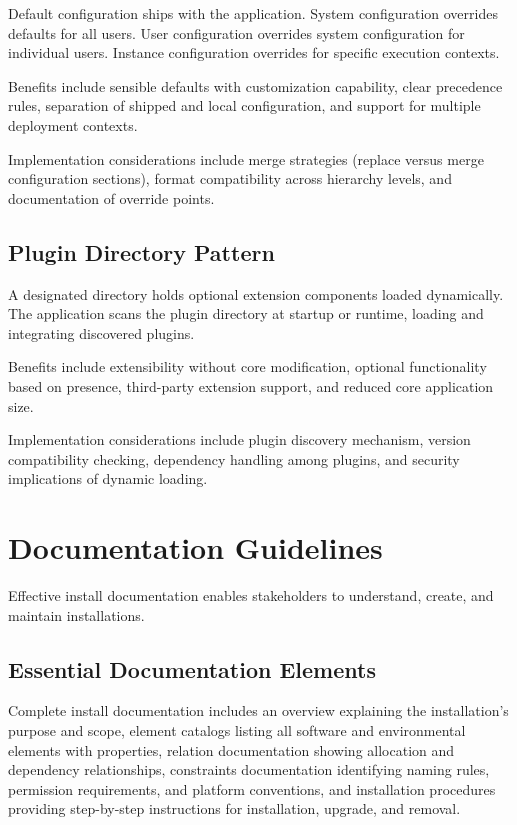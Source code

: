 \documentclass[11pt]{article}
\begin{document}
Default configuration ships with the application. System configuration overrides defaults for all users. User configuration overrides system configuration for individual users. Instance configuration overrides for specific execution contexts.

Benefits include sensible defaults with customization capability, clear precedence rules, separation of shipped and local configuration, and support for multiple deployment contexts.

Implementation considerations include merge strategies (replace versus merge configuration sections), format compatibility across hierarchy levels, and documentation of override points.

\subsection{Plugin Directory Pattern}

A designated directory holds optional extension components loaded dynamically. The application scans the plugin directory at startup or runtime, loading and integrating discovered plugins.

Benefits include extensibility without core modification, optional functionality based on presence, third-party extension support, and reduced core application size.

Implementation considerations include plugin discovery mechanism, version compatibility checking, dependency handling among plugins, and security implications of dynamic loading.

\section{Documentation Guidelines}

Effective install documentation enables stakeholders to understand, create, and maintain installations.

\subsection{Essential Documentation Elements}

Complete install documentation includes an overview explaining the installation's purpose and scope, element catalogs listing all software and environmental elements with properties, relation documentation showing allocation and dependency relationships, constraints documentation identifying naming rules, permission requirements, and platform conventions, and installation procedures providing step-by-step instructions for installation, upgrade, and removal.
\end{document}
